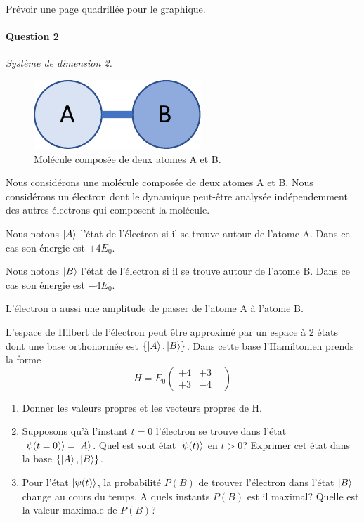 Prévoir une page quadrillée pour le graphique.

\paragraph{Question 2} \textit{Système de dimension 2.} \\

\begin{figure}[h!]
\begin{center}
\includegraphics[width=0.3\columnwidth]{Pictures/AB.pdf} 
\end{center}
\caption{Molécule composée de deux atomes A et B.
}
\label{fig:AB}
\end{figure}

Nous considérons une molécule composée de deux atomes A et B. Nous considérons un électron dont le dynamique peut-être analysée indépendemment des autres électrons qui composent la molécule.

Nous notons $\ket{A}$ l'état de l'électron si il se trouve autour de l'atome A. Dans ce cas son énergie est $+ 4 E_0$.

Nous notons $\ket{B}$ l'état de l'électron si il se trouve autour de l'atome B. Dans ce cas son énergie est $- 4 E_0$.

L'électron a aussi une amplitude de passer de l'atome A à l'atome B.

L'espace de Hilbert de l'électron peut être approximé par un espace à 2 états dont une base orthonormée est $\{\ket{A}, \ket{B}\}$. Dans cette base l'Hamiltonien prends la forme
\begin{equation}
H = E_0 \begin{pmatrix}
+4 & +3 \\
+3 & -4 & 
\end{pmatrix}
\end{equation}

\begin{enumerate}
\item Donner les valeurs propres et les vecteurs propres de H.

\item Supposons qu'à l'instant $t=0$ l'électron se trouve dans l'état $\ket{\psi(t=0)}=\ket{A}$. Quel est sont état $\ket{\psi(t)}$ en $t>0$? Exprimer cet état dans la base $\{\ket{A}, \ket{B}\}$.

\item Pour l'état $\ket{\psi(t)}$, la probabilité $P(B)$ de trouver l'électron dans l'état $\ket{B}$ change au cours du temps. A quels instants  $P(B)$ est il maximal? Quelle est la valeur maximale de $P(B)$?

\end{enumerate}


